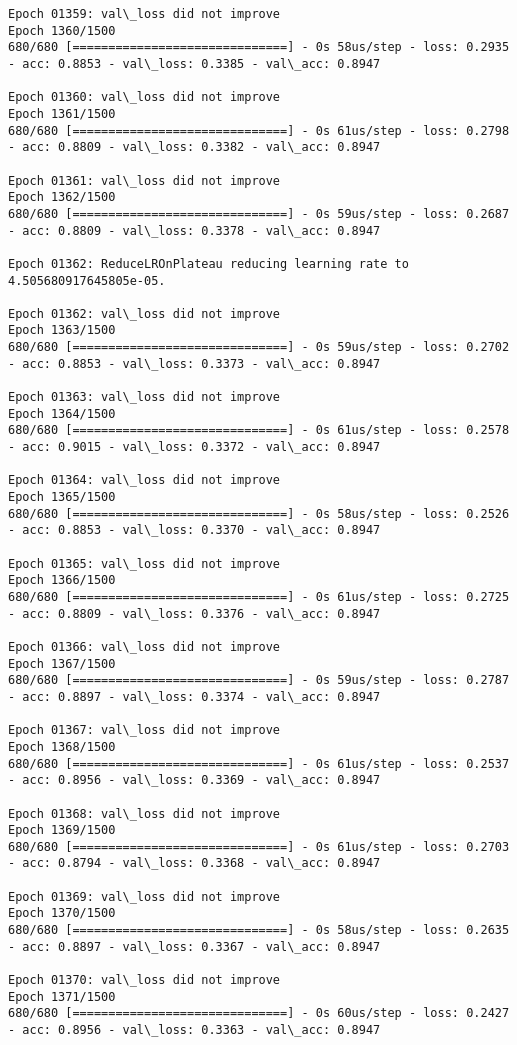 \documentclass[11pt]{article}
\begin{document}
\begin{Verbatim}[commandchars=\\\{\}]
Epoch 01359: val\_loss did not improve
Epoch 1360/1500
680/680 [==============================] - 0s 58us/step - loss: 0.2935 - acc: 0.8853 - val\_loss: 0.3385 - val\_acc: 0.8947

Epoch 01360: val\_loss did not improve
Epoch 1361/1500
680/680 [==============================] - 0s 61us/step - loss: 0.2798 - acc: 0.8809 - val\_loss: 0.3382 - val\_acc: 0.8947

Epoch 01361: val\_loss did not improve
Epoch 1362/1500
680/680 [==============================] - 0s 59us/step - loss: 0.2687 - acc: 0.8809 - val\_loss: 0.3378 - val\_acc: 0.8947

Epoch 01362: ReduceLROnPlateau reducing learning rate to 4.505680917645805e-05.

Epoch 01362: val\_loss did not improve
Epoch 1363/1500
680/680 [==============================] - 0s 59us/step - loss: 0.2702 - acc: 0.8853 - val\_loss: 0.3373 - val\_acc: 0.8947

Epoch 01363: val\_loss did not improve
Epoch 1364/1500
680/680 [==============================] - 0s 61us/step - loss: 0.2578 - acc: 0.9015 - val\_loss: 0.3372 - val\_acc: 0.8947

Epoch 01364: val\_loss did not improve
Epoch 1365/1500
680/680 [==============================] - 0s 58us/step - loss: 0.2526 - acc: 0.8853 - val\_loss: 0.3370 - val\_acc: 0.8947

Epoch 01365: val\_loss did not improve
Epoch 1366/1500
680/680 [==============================] - 0s 61us/step - loss: 0.2725 - acc: 0.8809 - val\_loss: 0.3376 - val\_acc: 0.8947

Epoch 01366: val\_loss did not improve
Epoch 1367/1500
680/680 [==============================] - 0s 59us/step - loss: 0.2787 - acc: 0.8897 - val\_loss: 0.3374 - val\_acc: 0.8947

Epoch 01367: val\_loss did not improve
Epoch 1368/1500
680/680 [==============================] - 0s 61us/step - loss: 0.2537 - acc: 0.8956 - val\_loss: 0.3369 - val\_acc: 0.8947

Epoch 01368: val\_loss did not improve
Epoch 1369/1500
680/680 [==============================] - 0s 61us/step - loss: 0.2703 - acc: 0.8794 - val\_loss: 0.3368 - val\_acc: 0.8947

Epoch 01369: val\_loss did not improve
Epoch 1370/1500
680/680 [==============================] - 0s 58us/step - loss: 0.2635 - acc: 0.8897 - val\_loss: 0.3367 - val\_acc: 0.8947

Epoch 01370: val\_loss did not improve
Epoch 1371/1500
680/680 [==============================] - 0s 60us/step - loss: 0.2427 - acc: 0.8956 - val\_loss: 0.3363 - val\_acc: 0.8947


\end{Verbatim}
\end{document}
